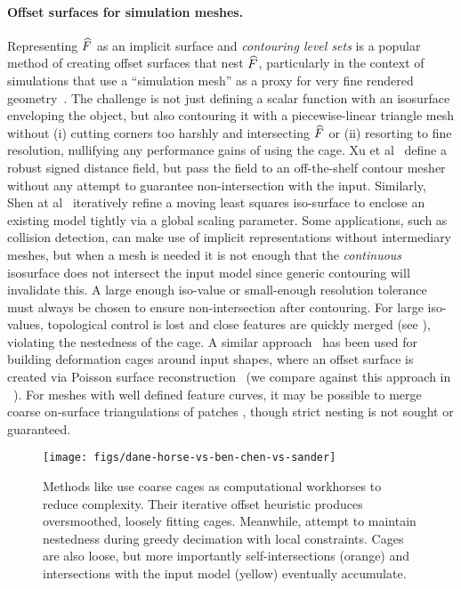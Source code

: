 \paragraph{Offset surfaces for simulation meshes.}
%
Representing $\widehat{F}$ as an implicit surface and \emph{contouring level
sets} is a popular method of creating offset surfaces that nest $\widehat{F}$,
particularly in the context of simulations that use a ``simulation mesh'' as a
proxy for very fine rendered geometry~\cite{Campen:2010}. The challenge is not
just defining a scalar function with an isosurface enveloping the object, but
also contouring it with a piecewise-linear triangle mesh without (i) cutting
corners too harshly and intersecting $\widehat{F}$ or (ii) resorting to fine
resolution, nullifying any performance gains of using the cage.
%
Xu et al~ define a robust signed distance field, but
pass the field to an off-the-shelf contour mesher without any attempt to
guarantee non-intersection with the input.  Similarly, Shen at
al~ iteratively refine a moving least squares
iso-surface to enclose an existing model tightly via a global scaling
parameter.
%
Some applications, such as collision detection, can make use of implicit
representations without intermediary meshes,
%
but when a mesh is needed it is not enough that the \emph{continuous}
isosurface does not intersect the input model since generic contouring will
invalidate this.
%
A large enough iso-value or
small-enough resolution tolerance must always be chosen to ensure
non-intersection after contouring. For large iso-values, topological control is
lost and close features are quickly merged (see ),
violating the nestedness of the cage. A similar
approach~\cite{Ben-Chen:2009:SDT} has been used for building deformation cages
around input shapes, where an offset surface is created via Poisson surface
reconstruction~\cite{PoissonSurfaceReconstruction06} (we compare against this
approach in ~).
%
For meshes with well defined feature curves, it may be possible to merge coarse
on-surface triangulations of patches \cite{Xian:2013}, though strict nesting is
not sought or guaranteed.

\begin{figure}
  \texttt{[image: figs/dane-horse-vs-ben-chen-vs-sander]}
  \caption{Methods like \protect\cite{Ben-Chen:2009:SDT} use coarse cages as
  computational workhorses to reduce complexity. Their iterative offset
  heuristic produces oversmoothed, loosely fitting cages.
  Meanwhile, \protect\cite{Sander:2000:SC} attempt to
  maintain nestedness during greedy decimation with local constraints. Cages
  are also loose, but more importantly self-intersections (orange) and
  intersections with the input model (yellow) eventually accumulate.}
  \label{fig:dane-vs-ben-chen}
\end{figure}

